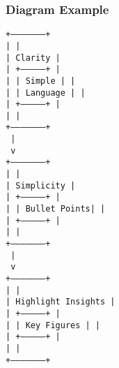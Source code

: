 \documentclass[aspectratio=169]{beamer}
\begin{document}
\begin{frame}[fragile]
    \frametitle{Diagram Example}
    \begin{center}
        \texttt{+--------------------+} \\
        \texttt{|                    |} \\
        \texttt{|    Clarity         |} \\
        \texttt{|   +--------------+ |} \\
        \texttt{|   | Simple      | |} \\
        \texttt{|   | Language    | |} \\
        \texttt{|   +--------------+ |} \\
        \texttt{|                    |} \\
        \texttt{+--------------------+} \\
                \texttt{        |} \\
                \texttt{        v} \\
        \texttt{+--------------------+} \\
        \texttt{|                    |} \\
        \texttt{|    Simplicity      |} \\
        \texttt{|   +--------------+ |} \\
        \texttt{|   | Bullet Points| |} \\
        \texttt{|   +--------------+ |} \\
        \texttt{|                    |} \\
        \texttt{+--------------------+} \\
                \texttt{        |} \\
                \texttt{        v} \\
        \texttt{+--------------------+} \\
        \texttt{|                    |} \\
        \texttt{| Highlight Insights  |} \\
        \texttt{|   +--------------+ |} \\
        \texttt{|   | Key Figures  | |} \\
        \texttt{|   +--------------+ |} \\
        \texttt{|                    |} \\
        \texttt{+--------------------+} \\        
    \end{center}
\end{frame}
\end{document}
